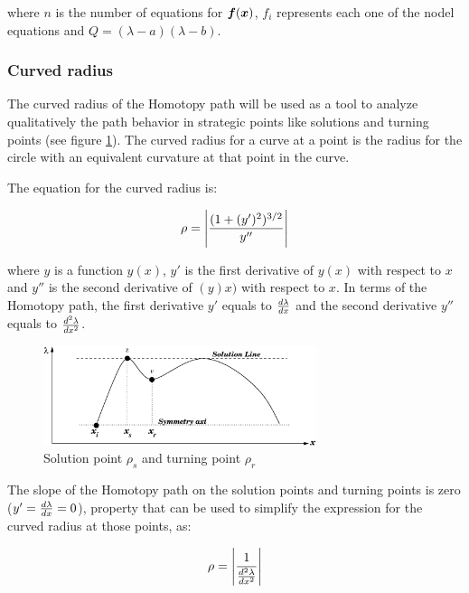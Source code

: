 \documentclass[conference,letterpaper,onecolumn]{IEEEtran}
\newcommand{\pig}[1]{\mbox{\boldmath ${#1}$}	}
\begin{document}
where $n$ is the number of equations for $\pig{f}(\pig{x})$, $f_i$ represents each one of the nodel equations and $Q=(\lambda-a)(\lambda-b)$.

\subsubsection{Curved radius}

The curved radius of the Homotopy path will be used as a tool to analyze qualitatively the path behavior in strategic points like solutions and turning points (see figure \ref{radio1}). The curved radius for a curve at a point is the radius for the circle with an equivalent curvature at that point in the curve.

The equation for the curved radius is:

\begin{displaymath}
\rho=  \Bigg |{{(1 + (y')^2)^{3/2}} \over {y''}} \Bigg |
\end{displaymath}

where $y$ is a function $y(x)$, $y'$ is the first derivative of $y(x)$ with respect to $x$ and $y''$ is the second derivative of $(y)x)$ with respect to $x$. In terms of the Homotopy path, the first derivative $y'$ equals to ${ {d \lambda} \over {dx}}$ and the second derivative $y''$ equals to ${ {d^2 \lambda} \over {dx^2}}$.

\begin{figure}[hbtp]
\centering
\includegraphics[width=8cm]{figs/chap3/figs/radiob.eps}
\caption{Solution point $\rho_s$ and turning point $\rho_r$}
\label{radio1}
\end{figure}

The slope of the Homotopy path on the solution points and turning points is zero ($y'={ {d \lambda} \over {dx}} =0$), property that can be used to simplify the expression for the curved radius at those points, as:

\begin{displaymath}
\rho= \Bigg | {1 \over {{ {d^2 \lambda} \over {dx^2}}}} \Bigg |
\end{displaymath}
\end{document}
